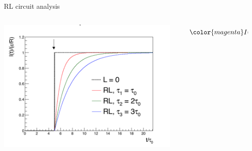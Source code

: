 %
%
%

\begin{frame}{RL circuit analysis}

\begin{columns}
  \begin{column}{0.70\textwidth}
       \begin{center}
           \includegraphics[width=0.95\textwidth]{./images/misc/ItRL_1.png}\\
       \end{center}
  \end{column}
  \begin{column}{0.30\textwidth}
      \begin{equation*}
       {\color{magenta}
            I(t) = \frac{\mathcal{E}}{R} \Big(1 - exp^{-\frac{t}{\tau}} \Big)
       }
      \end{equation*}
  \end{column}
\end{columns}

\end{frame}

%
%
%

